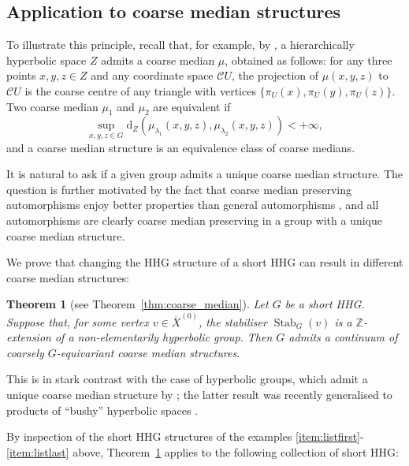\documentclass[svgnames]{amsart}
\theoremstyle{plain}
\newtheorem{thmintro}{Theorem}
\theoremstyle{definition}
\newcommand{\Z}{\mathbb{Z}}
\newcommand{\C}{\mathcal C}
\newcommand{\ov}[1]{\overline{#1}}
\newcommand{\dist}{\mathrm{d}}
\newcommand{\Stab}[2]{\operatorname{Stab}_{#1}(#2)}
\begin{document}
\subsection*{Application to coarse median structures}
To illustrate this principle, recall that, for example, by \cite[Theorem 7.3]{HHS_II}, a hierarchically hyperbolic space $Z$ admits a coarse median $\mu$, obtained as follows: for any three points $x,y,z\in Z$ and any coordinate space $\C U$, the projection of $\mu(x,y,z)$ to $\C U$ is the coarse centre of any triangle with vertices $\{\pi_U(x), \pi_U(y),\pi_U(z)\}$. Two coarse median $\mu_1$ and $\mu_2$ are equivalent if
$$\sup_{x,y,z\in G} \dist_Z(\mu_{\lambda_1}(x,y,z),\mu_{\lambda_2}(x,y,z))<+\infty,$$
and a coarse median structure is an equivalence class of coarse medians. 

It is natural to ask if a given group admits a unique coarse median structure. The question is further motivated by the fact that coarse median preserving automorphisms enjoy better properties than general automorphisms \cite{Elia:coarse_med_preserving}, and all automorphisms are clearly coarse median preserving in a group with a unique coarse median structure.

We prove that changing the HHG structure of a short HHG can result in different coarse median structures:

\begin{thmintro}[see Theorem~\ref{thm:coarse_median}]\label{thmintro_coarsemedian} Let $G$ be a short HHG. Suppose that, for some vertex $v\in\ov X^{(0)}$, the stabiliser $\Stab{G}{v}$ is a $\Z$-extension of a non-elementarily hyperbolic group. Then $G$ admits a continuum of coarsely $G$-equivariant coarse median structures.
\end{thmintro}
This is in stark contrast with the case of hyperbolic groups, which admit a unique coarse median structure by \cite{NWZ}; the latter result was recently generalised to products of ``bushy'' hyperbolic spaces \cite{FS_pantsgraph}.

By inspection of the short HHG structures of the examples \ref{item:listfirst}-\ref{item:listlast} above, Theorem~\ref{thmintro_coarsemedian} applies to the following collection of short HHG:
\end{document}
